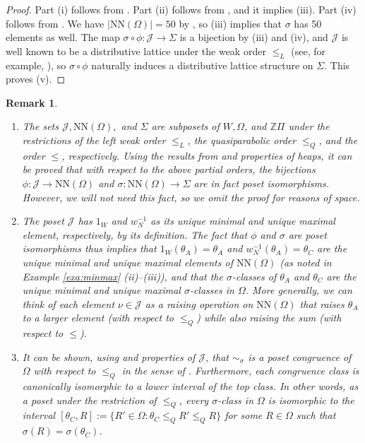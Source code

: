 \documentclass[10pt,a4paper]{amsart}
\newtheorem{rmk}[theorem]{Remark}
\numberwithin{equation}{section}
\newcommand{\Z}{{\mathbb Z}}
\newcommand{\ra}{\rightarrow}
\newcommand{\wnn}{w_{N}}
\newcommand{\calj}{\mathcal{J}}
\newcommand{\ob}{\Omega}
\newcommand{\nn}{\mathrm{NN}}
\newcommand{\inverse}{^{-1}}
\newcommand{\abs}[1]{\lvert #1 \rvert}
\begin{document}
\begin{proof}
Part (i) follows from \cite[Corollary 4.9 (i)]{gx5}. Part (ii) follows from
\cite[Proposition 5.15 (iii)]{gx5}, and it implies (iii). Part (iv) follows from
\cite[Theorem 5.13 (i)--(ii)]{gx5}. We have $\abs{\nn(\ob)}=50$ by \cite[Theorem
5.16, Proposition 6.9]{gx5}, so (iii) implies that $\sigma$ has 50 elements as
well. The map $\sigma\circ\phi: \calj\ra \Sigma$ is a bijection by (iii) and
(iv), and $\mathcal{J}$ is well known to be a distributive lattice under the
weak order $\le_L$ (see, for example, \cite[Theorem 3.2]{FC}), so
$\sigma\circ\phi$ naturally induces a distributive lattice structure on
$\Sigma$. This proves (v). 
\end{proof}


\begin{rmk}
\label{rmk:isos}
\begin{enumerate}
\item 
The sets $\calj, \nn(\ob),$ and $\Sigma$ are subposets of $W, \ob$, and $\Z\Pi$
under the restrictions of the left weak order $\le_L$, the quasiparabolic order
$\le_Q$, and the order $\le$, respectively. Using the results from
\cite[Proposition 5.12, Theorem 5.13]{gx5} and properties of heaps, it can be
proved that with respect to the above partial orders, the bijections
$\phi:\calj\ra \nn(\ob)$ and $\sigma:\nn(\ob)\ra \Sigma$ are in fact poset
isomorphisms. However, we will not need this fact, so we omit the proof for
reasons of space.

\item The poset $\calj$ has $1_W$ and $\wnn\inverse$
  as its unique minimal and unique maximal element, respectively, by its
  definition. The fact that
  $\phi$ and $\sigma$ are poset isomorphisms thus implies that
  $1_W(\theta_A)=\theta_A$  
  and $\wnn\inverse(\theta_A)=\theta_C$ are the unique minimal and unique
  maximal elements of $\nn(\ob)$ (as noted in Example \ref{exa:minmax}
(ii)--(iii)), and that the $\sigma$-classes of $\theta_A$ and $\theta_C$ are the
unique minimal and unique maximal $\sigma$-classes in $\ob$. More generally, we
can think of each element
 $\nu\in \calj$ as a raising operation on $\nn(\ob)$ that raises $\theta_A$ to
 a larger element (with respect to $\le_Q$) while also raising the sum (with
 respect to $\le$).

\item It can be shown, using \cite[Corollary 4.9, Proposition 5.12]{gx5} and
  properties of $\calj$, that $\sim_\sigma$ is a poset congruence of $\ob$ with
  respect to $\le_Q$ in the sense of \cite[Section 5]{reading02}. Furthermore,
  each congruence class is canonically isomorphic to a lower interval of the top
  class. In other words, as a poset under the restriction of $\le_Q$, every
  $\sigma$-class in $\ob$ is isomorphic to the interval $[\theta_C,R]:=\{R'\in
  \ob: \theta_C\le_Q R'\le_Q R\}$ for some $R\in \ob$ such that
$\sigma(R)=\sigma(\theta_C)$. \end{enumerate} \end{rmk}
\end{document}
